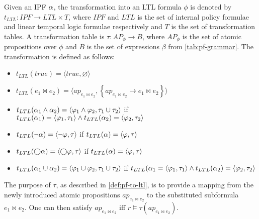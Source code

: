 \begin{definition}\label{def:pf-to-ltl}
Given an IPF $\alpha$, the transformation into an LTL formula $\phi$ is denoted by $t_{LTL} : IPF \rightarrow LTL \times T$, where $IPF$ and $LTL$ is the set of internal policy formulae and linear temporal logic formulae respectively and $T$ is the set of transformation tables. A transformation table is $\tau : AP_\phi \rightarrow B$, where $AP_\phi$ is the set of atomic propositions over $\phi$ and $B$ is the set of expressions $\beta$ from \autoref{tab:pf-grammar}. The transformation is defined as follows:
\begin{itemize}
    \item $t_{LTL}(true) = \langle true, \varnothing \rangle$
    \item $t_{LTL}(e_1 \bowtie e_2) = \langle ap_{e_1 \bowtie e_2}, \left\{ ap_{e_1 \bowtie e_2} \mapsto e_1 \bowtie e_2 \right\} \rangle$
    \item $t_{LTL}(\alpha_1 \land \alpha_2) = \langle \varphi_1 \land \varphi_2, \tau_1 \cup \tau_2 \rangle$ if $t_{LTL}(\alpha_1) = \langle \varphi_1, \tau_1 \rangle \land t_{LTL}(\alpha_2) = \langle \varphi_2, \tau_2 \rangle$
    \item $t_{LTL}(\lnot \alpha) = \langle \lnot \varphi, \tau \rangle$ if $t_{LTL}(\alpha) = \langle \varphi, \tau \rangle$
    \item $t_{LTL}(\bigcirc \alpha) = \langle \bigcirc \varphi, \tau \rangle$ if $t_{LTL}(\alpha) = \langle \varphi, \tau \rangle$
    \item $t_{LTL}(\alpha_1 \cup \alpha_2) = \langle \varphi_1 \cup \varphi_2, \tau_1 \cup \tau_2 \rangle$ if $t_{LTL}(\alpha_1 = \langle \varphi_1, \tau_1 \rangle \land t_{LTL}(\alpha_2) = \langle \varphi_2, \tau_2 \rangle$
\end{itemize}
\end{definition}
The purpose of $\tau$, as described in \autoref{def:pf-to-ltl}, is to provide a mapping from the newly introduced atomic propositions $ap_{e_1 \bowtie e_2}$ to the substituted subformula $e_1 \bowtie e_2$. One can then satisfy $ap_{e_1 \bowtie e_2}$ iff $r \models \tau(ap_{e_1 \bowtie e_2})$.

